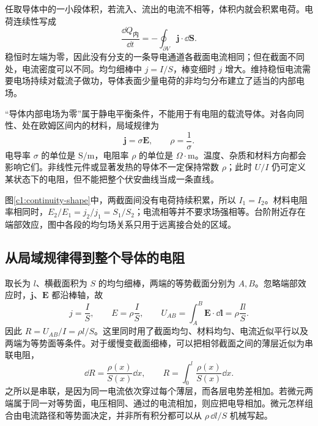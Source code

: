 任取导体中的一小段体积，若流入、流出的电流不相等，体积内就会积累电荷。电荷连续性写成
\[
 \frac{\dd Q_{\text{内}}}{\dd t}=-\oint_{\partial V}\bm j\cdot\dd\bm S.
\]
稳恒时左端为零，因此没有分支的一条导电通道各截面电流相同；但在截面不同处，电流密度可以不同。均匀细棒中 $j=I/S$，棒变细时 $j$ 增大。维持稳恒电流需要电场持续对载流子做功，导体表面少量电荷的非均匀分布建立了适当的内部电场。

“导体内部电场为零”属于静电平衡条件，不能用于有电阻的载流导体。对各向同性、处在欧姆区间内的材料，局域规律为
\[
 \bm j=\sigma\bm E,\qquad \rho=\frac1{\sigma}.
\]
电导率 $\sigma$ 的单位是 $\mathrm{S/m}$，电阻率 $\rho$ 的单位是 $\Omega\cdot\mathrm m$。温度、杂质和材料方向都会影响它们。非线性元件或显著发热的导体不一定保持常数 $\rho$；此时 $U/I$ 仍可定义某状态下的电阻，但不能把整个伏安曲线当成一条直线。

图\ref{c1:continuity-shape}中，两截面间没有电荷持续积累，所以 $I_1=I_2$。材料电阻率相同时，$E_2/E_1=j_2/j_1=S_1/S_2$；电流相等并不要求场强相等。台阶附近存在端部效应，图中各段的均匀场关系只用于远离接合处的区域。

\subsection{从局域规律得到整个导体的电阻}

取长为 $l$、横截面积为 $S$ 的均匀细棒，两端的等势截面分别为 $A,B$。忽略端部效应时，$\bm j$、$\bm E$ 都沿棒轴，故
\[
 j=\frac IS,\qquad E=\rho\frac IS,\qquad
 U_{AB}=\int_A^B\bm E\cdot\dd\bm l=\rho\frac{Il}{S}.
\]
因此 $R=U_{AB}/I=\rho l/S$。这里同时用了截面均匀、材料均匀、电流近似平行以及两端为等势面等条件。对于缓慢变截面细棒，可以把相邻截面之间的薄层近似为串联电阻，
\[
 \dd R=\frac{\rho(x)}{S(x)}\dd x,\qquad
 R=\int_0^l\frac{\rho(x)}{S(x)}\dd x.
\]
之所以是串联，是因为同一电流依次穿过每个薄层，而各层电势差相加。若微元两端属于同一对等势面，电压相同、通过的电流相加，则应把电导相加。微元怎样组合由电流路径和等势面决定，并非所有积分都可以从 $\rho\,\dd l/S$ 机械写起。


